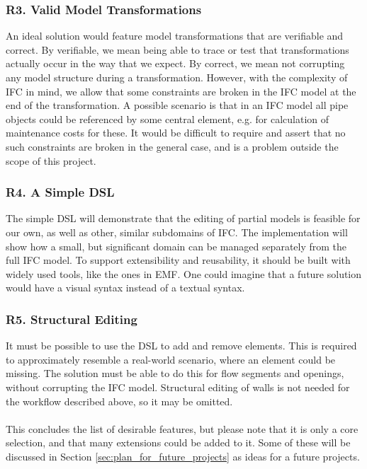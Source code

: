 \subsubsection{R3. Valid Model Transformations}
An ideal solution would feature model transformations that are verifiable and correct. By verifiable, we mean being able to trace or test that transformations actually occur in the way that we expect. By correct, we mean not corrupting any model structure during a transformation. However, with the complexity of IFC in mind, we allow that some constraints are broken in the IFC model at the end of the transformation. A possible scenario is that in an IFC model all pipe objects could be referenced by some central element, e.g. for calculation of maintenance costs for these. It would be difficult to require and assert that no such constraints are broken in the general case, and is a problem outside the scope of this project.

\subsubsection{R4. A Simple DSL}
The simple DSL will demonstrate that the editing of partial models is feasible for our own, as well as other, similar subdomains of IFC. The implementation will show how a small, but significant domain can be managed separately from the full IFC model. To support extensibility and reusability, it should be built with widely used tools, like the ones in EMF.  One could imagine that a future solution would have a visual syntax instead of a textual syntax.

\subsubsection{R5. Structural Editing}
It must be possible to use the DSL to add and remove elements. This is required to approximately resemble a real-world scenario, where an element could be missing. The solution must be able to do this for flow segments and openings, without corrupting the IFC model. Structural editing of walls is not needed for the workflow described above, so it may be omitted.

\paragraph{}
This concludes the list of desirable features, but please note that it is only a core selection, and that many extensions could be added to it. Some of these will be discussed in Section \ref{sec:plan_for_future_projects} as ideas for a future projects.

